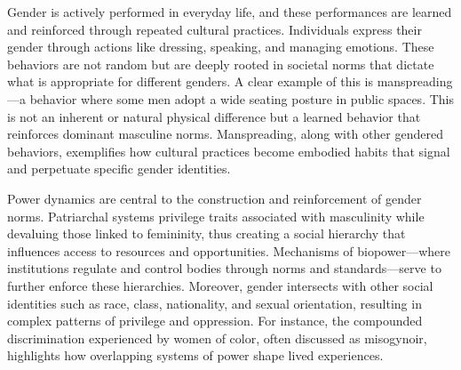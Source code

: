 \documentclass{article}
\begin{document}
Gender is actively performed in everyday life, and these performances are learned and reinforced through repeated cultural practices.
Individuals express their gender through actions like dressing, speaking, and managing emotions.
These behaviors are not random but are deeply rooted in societal norms that dictate what is appropriate for different genders.
A clear example of this is manspreading—a behavior where some men adopt a wide seating posture in public spaces.
This is not an inherent or natural physical difference but a learned behavior that reinforces dominant masculine norms.
Manspreading, along with other gendered behaviors, exemplifies how cultural practices become embodied habits that signal and perpetuate specific gender identities.

Power dynamics are central to the construction and reinforcement of gender norms.
Patriarchal systems privilege traits associated with masculinity while devaluing those linked to femininity, thus creating a social hierarchy that influences access to resources and opportunities.
Mechanisms of biopower—where institutions regulate and control bodies through norms and standards—serve to further enforce these hierarchies.
Moreover, gender intersects with other social identities such as race, class, nationality, and sexual orientation, resulting in complex patterns of privilege and oppression.
For instance, the compounded discrimination experienced by women of color, often discussed as misogynoir, highlights how overlapping systems of power shape lived experiences.
\end{document}

